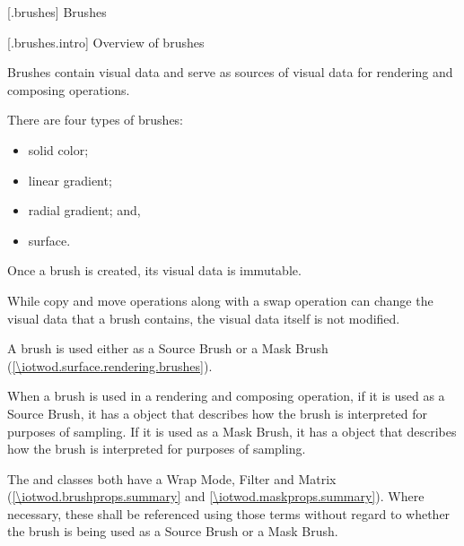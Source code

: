 
 [\iotwod.brushes] {Brushes}

 [\iotwod.brushes.intro] {Overview of brushes}

\pnum
Brushes contain visual data and serve as sources of visual data for rendering and composing operations.

\pnum
There are four types of brushes:
\begin{itemize}
	\item solid color;
	\item linear gradient;
	\item radial gradient; and,
	\item surface.
\end{itemize}

\pnum
Once a brush is created, its visual data is immutable.

\pnum
\begin{note}
While copy and move operations along with a swap operation can change the visual data that a brush contains, the visual data itself is not modified.
\end{note}

\pnum
A brush is used either as a Source Brush or a Mask Brush (\ref{\iotwod.surface.rendering.brushes}).

\pnum
When a brush is used in a rendering and composing operation, if it is used as a Source Brush, it has a  object that describes how the brush is interpreted for purposes of sampling. If it is used as a Mask Brush, it has a  object that describes how the brush is interpreted for purposes of sampling.

\pnum
The  and  classes both have a Wrap Mode, Filter and Matrix (\ref{\iotwod.brushprops.summary} and \ref{\iotwod.maskprops.summary}). Where necessary, these shall be referenced using those terms without regard to whether the brush is being used as a Source Brush or a Mask Brush.


